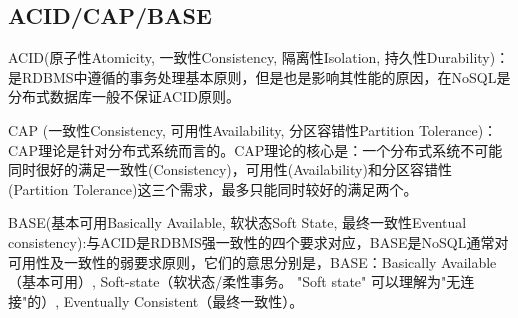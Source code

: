 \documentclass[../../../interview-questions.tex]{subfiles}
\begin{document}
\subsection{ACID/CAP/BASE}

ACID(原子性Atomicity, 一致性Consistency, 隔离性Isolation, 持久性Durability)：是RDBMS中遵循的事务处理基本原则，但是也是影响其性能的原因，在NoSQL是分布式数据库一般不保证ACID原则。

CAP (一致性Consistency, 可用性Availability, 分区容错性Partition Tolerance)：CAP理论是针对分布式系统而言的。CAP理论的核心是：一个分布式系统不可能同时很好的满足一致性(Consistency)，可用性(Availability)和分区容错性(Partition Tolerance)这三个需求，最多只能同时较好的满足两个。

BASE(基本可用Basically Available, 软状态Soft State, 最终一致性Eventual consistency):与ACID是RDBMS强一致性的四个要求对应，BASE是NoSQL通常对可用性及一致性的弱要求原则，它们的意思分别是，BASE：Basically Available（基本可用）, Soft-state（软状态/柔性事务。 "Soft state" 可以理解为"无连接"的）, Eventually Consistent（最终一致性）。
\end{document}
